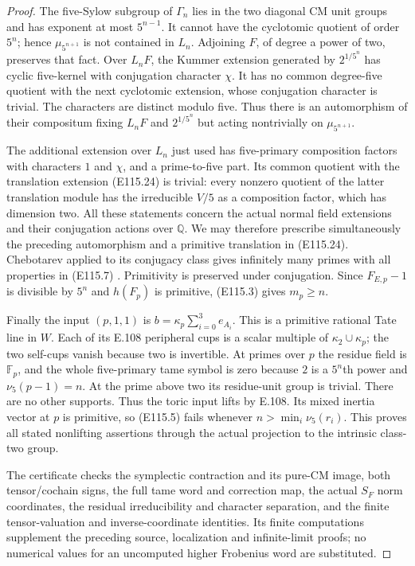 \begin{proof}
The five-Sylow subgroup of $\Gamma_n$ lies in the two
diagonal CM unit groups and has exponent at most $5^{n-1}$.
It cannot have the cyclotomic quotient of order $5^n$;
hence $\mu_{5^{n+1}}$ is not contained in $L_n$.
Adjoining $F$, of degree a power of two, preserves that fact.
Over $L_nF$, the Kummer extension generated by $2^{1/5^n}$
has cyclic five-kernel with conjugation character $\chi$.
It has no common degree-five quotient with the next
cyclotomic extension, whose conjugation character is trivial.
The characters are distinct modulo five.
Thus there is an automorphism of their compositum fixing
$L_nF$ and $2^{1/5^n}$ but acting nontrivially on
$\mu_{5^{n+1}}$.

The additional extension over $L_n$ just used has five-primary
composition factors with characters $1$ and $\chi$, and a
prime-to-five part.  Its common quotient with the translation
extension (E115.24) is trivial: every nonzero quotient of the
latter translation module has the irreducible $V/5$ as a
composition factor, which has dimension two.
All these statements concern the actual normal field
extensions and their conjugation actions over $\mathbb Q$.
We may therefore prescribe simultaneously the preceding
automorphism and a primitive translation in (E115.24).
Chebotarev applied to its conjugacy class gives infinitely
many primes with all properties in (E115.7)
\cite[VIII,Theorem 7.4 and proof]{E_MilneCFT}.
Primitivity is preserved under conjugation.
Since $F_{E,p}-1$ is divisible by $5^n$ and $h(F_p)$ is
primitive, (E115.3) gives $m_p\ge n$.

Finally the input $(p,1,1)$ is
$b=\kappa_p\sum_{i=0}^3e_{A_i}$.
This is a primitive rational Tate line in $W$.
Each of its E.108 peripheral cups is a scalar multiple of
$\kappa_2\cup\kappa_p$; the two self-cups vanish because
two is invertible.  At primes over $p$ the residue field is
$\mathbb F_p$, and the whole five-primary tame symbol is
zero because $2$ is a $5^n$th power and $\nu_5(p-1)=n$.
At the prime above two its residue-unit group is trivial.
There are no other supports.  Thus the toric input lifts by
E.108.  Its mixed inertia vector at $p$ is primitive, so
(E115.5) fails whenever $n>\min_i\nu_5(r_i)$.
This proves all stated nonlifting assertions through the
actual projection to the intrinsic class-two group.

The certificate checks the symplectic contraction and its
pure-CM image, both tensor/cochain signs, the full tame word
and correction map, the actual $S_F$ norm coordinates,
the residual irreducibility and character separation, and
the finite tensor-valuation and inverse-coordinate identities.
Its finite computations supplement the preceding source,
localization and infinite-limit proofs; no numerical values
for an uncomputed higher Frobenius word are substituted.
\end{proof}
